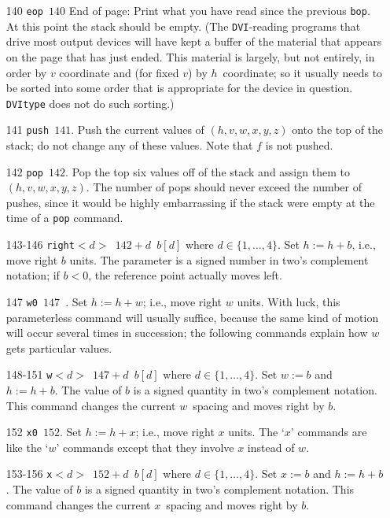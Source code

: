 \documentclass{article}
\begin{document}
\begin{itemize}
\item[140] \texttt{eop $140$} 
End of page: 
Print what you have read since the previous \texttt{bop}. 
At this point the stack should be empty. 
(The \texttt{DVI}-reading programs that drive most output devices 
will have kept a buffer of the material 
that appears on the page that has just ended. 
This material is largely, but not entirely, 
in order by $v$ coordinate and (for fixed $v$) by $h$~coordinate; 
so it usually needs to be sorted into some order that is
appropriate for the device in question. 
\texttt{DVItype} does not do such sorting.)


\item[141] \texttt{push $141$}. 
Push the current values of $(h,v,w,x,y,z)$ onto the top of the stack; 
do not change any of these values. Note that $f$ is not pushed. 


\item[142] \texttt{pop $142$}. 
Pop the top six values off of the stack and assign them to $(h,v,w,x,y,z)$. 
The number of pops should never exceed the number of pushes, 
since it would be highly embarrassing if the stack were empty 
at the time of a \texttt{pop} command.

\item[143-146] \texttt{right$<d>$ $142+d$ $b[d]$} where $d\in\{1,\dots,4\}$. 
Set $h:=h+b$, i.e., move right $b$ units.
The parameter is a signed number in two's complement notation; 
if $b<0$, the reference point actually moves left.

\item[147] \texttt{w0 $147$ }. 
Set $h:=h+w$; i.e., move right $w$ units. With luck,
this parameterless command will usually suffice, because the same kind of motion
will occur several times in succession; the following commands explain how
$w$ gets particular values. 

\item[148-151] \texttt{w$<d>$ $147+d$ $b[d]$} where $d\in\{1,\dots,4\}$. 
Set $w:=b$ and $h:=h+b$. 
The value of $b$ is a signed quantity in two's complement notation. 
This command changes the current $w$~spacing and moves right by $b$.


\item[152] \texttt{x0 $152$}. 
Set $h:=h+x$; i.e., move right $x$ units. The `$x$'
commands are like the `$w$' commands except that they involve $x$ instead
of $w$.

\item[153-156] \texttt{x$<d>$ $152+d$ $b[d]$} where $d\in\{1,\dots,4\}$. 
Set $x:=b$ and $h:=h+b$. 
The value of $b$ is a signed quantity in two's complement notation. 
This command changes the current $x$~spacing and moves right by $b$.



\end{itemize}
\end{document}

